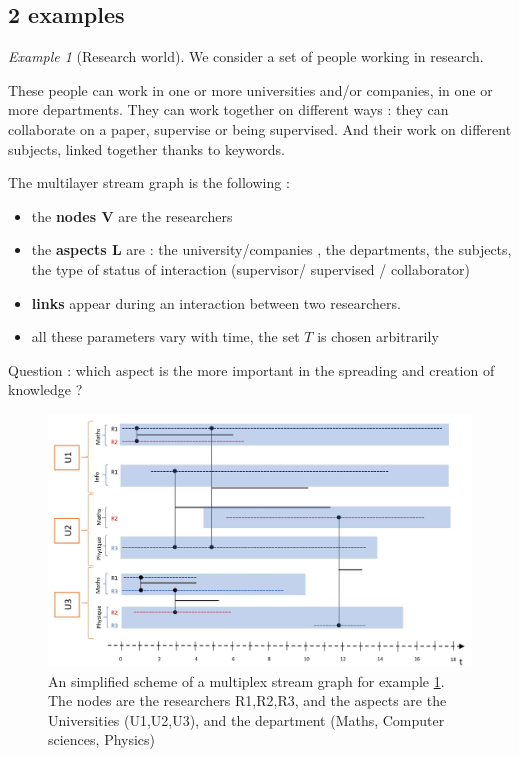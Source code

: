 \documentclass[dvipsnames,a4paper,11pt]{article}
\theoremstyle{definition}
\theoremstyle{remark}
\theoremstyle{remark}
\newtheorem{ex}{Example}
\begin{document}
	\subsection{2 examples}
	\begin{ex}[Research world]\label{exresearch}
	We consider a set of people working in research.
	
	These people can work in one or more universities and/or companies, in one or more departments. They can work together on different ways : they can collaborate on a paper, supervise or being supervised. And their work on different subjects, linked together thanks to keywords.


	The multilayer stream graph is the following :
	\begin{itemize}
		\item the {\bf nodes V} are the researchers
		\item the {\bf aspects L} are : the university/companies , the departments, the subjects, the type of status of interaction (supervisor/ supervised / collaborator) 
		\item {\bf links} appear during an interaction between two researchers.
		\item all these parameters vary with time, the set $T$ is chosen arbitrarily
	\end{itemize}
	
	Question : which aspect is the more important in the spreading and creation of knowledge ?
	
	\end{ex}
	
	\begin{figure}
    	\centering
    	\includegraphics[width=15cm]{schemas/chercheurs.jpg}
    	\caption{An simplified scheme of a multiplex stream graph for example \ref{exresearch}. The nodes are the researchers R1,R2,R3, and the aspects are the Universities (U1,U2,U3), and the department (Maths, Computer sciences, Physics)}
    	\label{fig:chercheurs}
	\end{figure}
	
\end{document}
